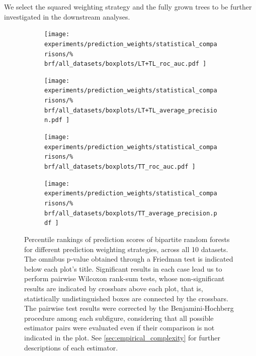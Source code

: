 
We select the squared weighting strategy and the fully grown trees to be further investigated in the downstream analyses. %


\begin{figure}[tbh]
    \centering
    \begin{subfigure}{0.49\textwidth}
        \texttt{[image: 
            experiments/prediction\_weights/statistical\_comparisons/\%
            brf/all\_datasets/boxplots/LT+TL\_roc\_auc.pdf
        ]}
    \end{subfigure}
    \begin{subfigure}{0.49\textwidth}
        \texttt{[image: 
            experiments/prediction\_weights/statistical\_comparisons/\%
            brf/all\_datasets/boxplots/LT+TL\_average\_precision.pdf
        ]}
    \end{subfigure}

    \begin{subfigure}{0.49\textwidth}
        \texttt{[image: 
            experiments/prediction\_weights/statistical\_comparisons/\%
            brf/all\_datasets/boxplots/TT\_roc\_auc.pdf
        ]}
    \end{subfigure}
    \begin{subfigure}{0.49\textwidth}
        \texttt{[image: 
            experiments/prediction\_weights/statistical\_comparisons/\%
            brf/all\_datasets/boxplots/TT\_average\_precision.pdf
        ]}
    \end{subfigure}
    \caption{
        Percentile rankings of prediction scores of bipartite random forests for different prediction weighting strategies, across all 10 datasets.
        The omnibus p-value obtained through a Friedman test is indicated below each plot's title. Significant results in each case lead us to perform pairwise Wilcoxon rank-sum tests, whose non-significant results are indicated by crossbars above each plot, that is, statistically undistinguished boxes are connected by the crossbars. The pairwise test results were corrected by the Benjamini-Hochberg procedure among each subfigure, considering that all possible estimator pairs were evaluated even if their comparison is not indicated in the plot. See \autoref{sec:empirical_complexity} for further descriptions of each estimator.
    }
    \label{fig:pred_weights_brf}
\end{figure}


